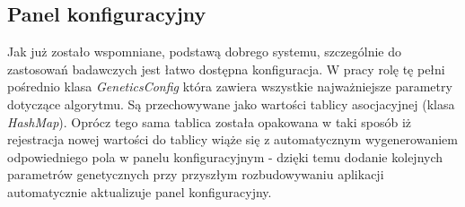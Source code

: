 \subsection{Panel konfiguracyjny}
\begin{par}
	Jak już zostało wspomniane, podstawą dobrego systemu, szczególnie do zastosowań badawczych jest łatwo dostępna konfiguracja. 
	W pracy rolę tę pełni pośrednio klasa \textit{GeneticsConfig} która zawiera wszystkie najważniejsze parametry dotyczące algorytmu. Są przechowywane jako wartości tablicy asocjacyjnej (klasa \textit{HashMap}). 
	Oprócz tego sama tablica została opakowana w taki sposób iż rejestracja nowej wartości do tablicy wiąże się z automatycznym wygenerowaniem odpowiedniego pola w panelu konfiguracyjnym - dzięki temu dodanie kolejnych parametrów genetycznych przy przyszłym rozbudowywaniu aplikacji automatycznie aktualizuje panel konfiguracyjny.
\end{par}

